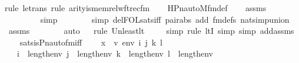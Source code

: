 \begin{isabellebody}
{\isacharparenleft}{\kern0pt}rule\ le{\isacharunderscore}{\kern0pt}trans{\isacharcomma}{\kern0pt}\ rule\ arity{\isacharunderscore}{\kern0pt}is{\isacharunderscore}{\kern0pt}memrel{\isacharunderscore}{\kern0pt}wftrec{\isacharunderscore}{\kern0pt}fm{\isacharparenright}{\kern0pt}\isanewline
\ \ \isamarkupfalse%
\ HPn{\isacharunderscore}{\kern0pt}auto{\isacharunderscore}{\kern0pt}M{\isacharunderscore}{\kern0pt}fm{\isacharprime}{\kern0pt}{\isacharunderscore}{\kern0pt}def\isanewline
\ \ \isamarkupfalse%
\ assms\ \isanewline
\ \ \ \ \ \ \ \isamarkupfalse%
\ simp\isanewline
\ \ \ \ \ \ \isamarkupfalse%
\ {\isacharparenleft}{\kern0pt}simp\ del{\isacharcolon}{\kern0pt}FOL{\isacharunderscore}{\kern0pt}sats{\isacharunderscore}{\kern0pt}iff\ pair{\isacharunderscore}{\kern0pt}abs\ add{\isacharcolon}{\kern0pt}\ fm{\isacharunderscore}{\kern0pt}defs\ nat{\isacharunderscore}{\kern0pt}simp{\isacharunderscore}{\kern0pt}union{\isacharparenright}{\kern0pt}\isanewline
\ \ \isamarkupfalse%
\ assms\ \isanewline
\ \ \ \ \ \isamarkupfalse%
\ auto{\isacharbrackleft}{\kern0pt}{}{\isacharbrackright}{\kern0pt}\isanewline
\ \ \isamarkupfalse%
{\isacharparenleft}{\kern0pt}rule\ Un{\isacharunderscore}{\kern0pt}least{\isacharunderscore}{\kern0pt}lt{\isacharparenright}{\kern0pt}{\isacharplus}{\kern0pt}\isanewline
\ \ \ \ \isamarkupfalse%
{\isacharparenleft}{\kern0pt}simp{\isacharcomma}{\kern0pt}\ rule\ ltI{\isacharcomma}{\kern0pt}\ simp{\isacharcomma}{\kern0pt}\ simp\ add{\isacharcolon}{\kern0pt}assms{\isacharparenright}{\kern0pt}{\isacharplus}{\kern0pt}\isanewline
\ \ \isamarkupfalse%
%
\endisatagproof
{\isafoldproof}%
%
\isadelimproof
\isanewline
%
\endisadelimproof
\isanewline
{}\isamarkupfalse%
\ sats{\isacharunderscore}{\kern0pt}is{\isacharunderscore}{\kern0pt}Pn{\isacharunderscore}{\kern0pt}auto{\isacharunderscore}{\kern0pt}fm{\isacharunderscore}{\kern0pt}iff\ {\isacharcolon}{\kern0pt}\isanewline
\ \ \ x\ {\isasympi}\ v\ env\ i\ j\ k\ l\isanewline
\ \ \ {\isachardoublequoteopen}i\ {\isacharless}{\kern0pt}\ length{\isacharparenleft}{\kern0pt}env{\isacharparenright}{\kern0pt}{\isachardoublequoteclose}\ {\isachardoublequoteopen}j\ {\isacharless}{\kern0pt}\ length{\isacharparenleft}{\kern0pt}env{\isacharparenright}{\kern0pt}{\isachardoublequoteclose}\ {\isachardoublequoteopen}k\ {\isacharless}{\kern0pt}\ length{\isacharparenleft}{\kern0pt}env{\isacharparenright}{\kern0pt}{\isachardoublequoteclose}\ {\isachardoublequoteopen}l\ {\isacharless}{\kern0pt}\ length{\isacharparenleft}{\kern0pt}env{\isacharparenright}{\kern0pt}{\isachardoublequoteclose}\ \isanewline

\end{isabellebody}
